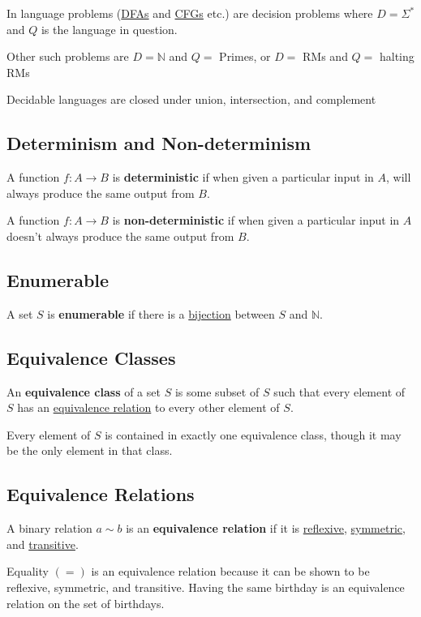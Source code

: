 \documentclass{article}
\begin{document}
In language problems (\hyperref[dfa]{DFAs} and \hyperref[cfg]{CFGs} etc.) are decision problems where $D = \Sigma^*$ and $Q$ is the language in question.

Other such problems are $D = \mathbb{N}$ and $Q =$ Primes, or $D=$ RMs and $Q =$ halting RMs

Decidable languages are closed under union, intersection, and complement


\subsection{Determinism and Non-determinism}\label{deterministic}
A function $f : A \to B$ is \textbf{deterministic} if when given a particular input in $A$, will always produce the same output from $B$.

A function $f : A \to B$ is \textbf{non-deterministic} if when given a particular input in $A$ doesn't always produce the same output from $B$.


\subsection{Enumerable}\label{enumerable}
A set $S$ is \textbf{enumerable} if there is a \hyperref[bijection]{bijection} between $S$ and $\mathbb{N}$.


\subsection{Equivalence Classes}\label{equivalence-class}
An \textbf{equivalence class} of a set $S$ is some subset of $S$ such that every element of $S$ has an \hyperref[equivalence-relation]{equivalence relation} to every other element of $S$.

Every element of $S$ is contained in exactly one equivalence class, though it may be the only element in that class.


\subsection{Equivalence Relations}\label{equivalence-relation}
A binary relation $a \sim b$ is an \textbf{equivalence relation} if it is \hyperref[reflexive]{reflexive}, \hyperref[symmetric]{symmetric}, and \hyperref[transitive]{transitive}.

Equality $(=)$ is an equivalence relation because it can be shown to be reflexive, symmetric, and transitive. Having the same birthday is an equivalence relation on the set of birthdays.
\end{document}
